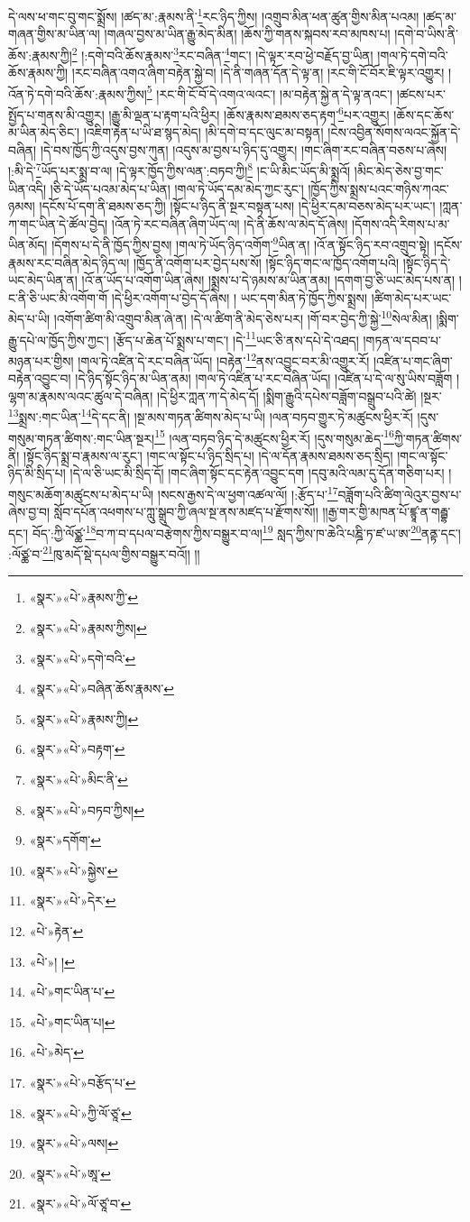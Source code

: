 དེ་ལས་ཕ་གང་བུ་གང་སྨྲོས། །ཚད་མ་:རྣམས་ནི་\footnote{«སྣར་»«པེ་»རྣམས་ཀྱི་}རང་ཉིད་ཀྱིས། །འགྲུབ་མིན་ཕན་ཚུན་གྱིས་མིན་པའམ། །ཚད་མ་གཞན་གྱིས་མ་ཡིན་ལ། །གཞལ་བྱས་མ་ཡིན་རྒྱུ་མེད་མིན། །ཆོས་ཀྱི་གནས་སྐབས་རབ་མཁས་པ། །དགེ་བ་ཡིས་ནི་ཆོས་:རྣམས་ཀྱི།\footnote{«སྣར་»«པེ་»རྣམས་ཀྱིས།} །:དགེ་བའི་ཆོས་རྣམས་\footnote{«སྣར་»«པེ་»དགེ་བའི་}རང་བཞིན་\footnote{«སྣར་»«པེ་»བཞིན་ཆོས་རྣམས་}གང་། །དེ་ལྟར་རབ་ཕྱེ་བརྗོད་བྱ་ཡིན། །གལ་ཏེ་དགེ་བའི་ཆོས་རྣམས་ཀྱི། །རང་བཞིན་འགའ་ཞིག་བརྟེན་སྐྱེ་བ། །དེ་ནི་གཞན་དོན་དེ་ལྟ་ན། །རང་གི་ངོ་བོར་ཇི་ལྟར་འགྱུར། །འོན་ཏེ་དགེ་བའི་ཆོས་:རྣམས་ཀྱིས།\footnote{«སྣར་»«པེ་»རྣམས་ཀྱི།} །རང་གི་ངོ་བོ་དེ་འགའ་ལའང་། །མ་བརྟེན་སྐྱེ་ན་དེ་ལྟ་ནའང་། །ཚངས་པར་སྤྱོད་པ་གནས་མི་འགྱུར། །རྒྱུ་མི་ལྡན་པ་རྟག་པའི་ཕྱིར། །ཆོས་རྣམས་ཐམས་ཅད་རྟག་\footnote{«སྣར་»«པེ་»བརྟག་}པར་འགྱུར། །ཆོས་དང་ཆོས་མ་ཡིན་མེད་ཅིང་། །འཇིག་རྟེན་པ་ཡི་ཐ་སྙད་མེད། །མི་དགེ་བ་དང་ལུང་མ་བསྟན། །ངེས་འབྱིན་སོགས་ལའང་སྐྱོན་དེ་བཞིན། །དེ་བས་ཁྱོད་ཀྱི་འདུས་བྱས་ཀུན། །འདུས་མ་བྱས་པ་ཉིད་དུ་འགྱུར། །གང་ཞིག་རང་བཞིན་བཅས་པ་ཞེས། །:མི་དེ་\footnote{«སྣར་»«པེ་»མིང་ནི་}ཡོད་པར་སྨྲ་བ་ལ། །དེ་ལྟར་ཁྱོད་ཀྱིས་ལན་:བཏབ་ཀྱི།\footnote{«སྣར་»«པེ་»བཏབ་ཀྱིས།} །ང་ཡི་མིང་ཡོད་མི་སྨྲའོ། །མིང་མེད་ཅེས་བྱ་གང་ཡིན་འདི། །ཅི་དེ་ཡོད་པའམ་མེད་པ་ཡིན། །གལ་ཏེ་ཡོད་དམ་མེད་ཀྱང་རུང་། །ཁྱོད་ཀྱིས་སྨྲས་པའང་གཉིས་ཀའང་ཉམས། །དངོས་པོ་དག་ནི་ཐམས་ཅད་ཀྱི། །སྟོང་པ་ཉིད་ནི་སྔར་བསྟན་པས། །དེ་ཕྱིར་དམ་བཅས་མེད་པར་ཡང་། །ཀླན་ཀ་གང་ཡིན་དེ་ཚོལ་བྱེད། །འོན་ཏེ་རང་བཞིན་ཞིག་ཡོད་ལ། །དེ་ནི་ཆོས་ལ་མེད་དོ་ཞེས། །དོགས་འདི་རིགས་པ་མ་ཡིན་མོད། །དོགས་པ་དེ་ནི་ཁྱོད་ཀྱིས་བྱས། །གལ་ཏེ་ཡོད་ཉིད་འགོག་\footnote{«སྣར་»དགོག་}ཡིན་ན། །འོ་ན་སྟོང་ཉིད་རབ་འགྲུབ་སྟེ། །དངོས་རྣམས་རང་བཞིན་མེད་ཉིད་ལ། །ཁྱོད་ནི་འགོག་པར་བྱེད་པས་སོ། །སྟོང་ཉིད་གང་ལ་ཁྱོད་འགོག་པའི། །སྟོང་ཉིད་དེ་ཡང་མེད་ཡིན་ན། །འོ་ན་ཡོད་པ་འགོག་ཡིན་ཞེས། །སྨྲས་པ་དེ་ཉམས་མ་ཡིན་ནམ། །དགག་བྱ་ཅི་ཡང་མེད་པས་ན། །ང་ནི་ཅི་ཡང་མི་འགོག་གོ །དེ་ཕྱིར་འགོག་པ་བྱེད་དོ་ཞེས། །
ཡང་དག་མིན་ཏེ་ཁྱོད་ཀྱིས་སྨྲས། །ཚིག་མེད་པར་ཡང་མེད་པ་ཡི། །འགོག་ཚིག་མི་འགྲུབ་མིན་ཞེ་ན། །དེ་ལ་ཚིག་ནི་མེད་ཅེས་པར། །གོ་བར་བྱེད་ཀྱི་སྐྱེ་\footnote{«སྣར་»«པེ་»སྐྱེས་}སེལ་མིན། །སྨིག་རྒྱུ་དཔེ་ལ་ཁྱོད་ཀྱིས་ཀྱང་། །རྩོད་པ་ཆེན་པོ་སྨྲས་པ་གང་། །དེ་\footnote{«སྣར་»«པེ་»དེར་}ཡང་ཅི་ནས་དཔེ་དེ་འཐད། །གཏན་ལ་དབབ་པ་མཉན་པར་གྱིས། །གལ་ཏེ་འཛིན་དེ་རང་བཞིན་ཡོད། །བརྟེན་\footnote{«པེ་»རྟེན་}ནས་འབྱུང་བར་མི་འགྱུར་རོ། །འཛིན་པ་གང་ཞིག་བརྟེན་འབྱུང་བ། །དེ་ཉིད་སྟོང་ཉིད་མ་ཡིན་ནམ། །གལ་ཏེ་འཛིན་པ་རང་བཞིན་ཡོད། །འཛིན་པ་དེ་ལ་སུ་ཡིས་བཟློག །ལྷག་མ་རྣམས་ལའང་ཚུལ་དེ་བཞིན། །དེ་ཕྱིར་ཀླན་ཀ་དེ་མེད་དོ། །སྨིག་རྒྱུའི་དཔེས་བཟློག་བསྒྲུབ་པའི་ཚེ། །སྔར་\footnote{«པེ་»། །}སྨྲས་:གང་ཡིན་\footnote{«པེ་»གང་ཡིན་པ་}དེ་དང་ནི། །སྔ་མས་གཏན་ཚིགས་མེད་པ་ཡི། །ལན་བཏབ་གྱུར་ཏེ་མཚུངས་ཕྱིར་རོ། །དུས་གསུམ་གཏན་ཚིགས་:གང་ཡིན་སྔར།\footnote{«པེ་»གང་ཡིན་པ།} །ལན་བཏབ་ཉིད་དེ་མཚུངས་ཕྱིར་རོ། །དུས་གསུམ་ཆེད་\footnote{«པེ་»མེད་}ཀྱི་གཏན་ཚིགས་ནི། །སྟོང་ཉིད་སྨྲ་བ་རྣམས་ལ་རུང་། །གང་ལ་སྟོང་པ་ཉིད་སྲིད་པ། །དེ་ལ་དོན་རྣམས་ཐམས་ཅད་སྲིད། །གང་ལ་སྟོང་ཉིད་མི་སྲིད་པ། །དེ་ལ་ཅི་ཡང་མི་སྲིད་དོ། །གང་ཞིག་སྟོང་དང་རྟེན་འབྱུང་དག །དབུ་མའི་ལམ་དུ་དོན་གཅིག་པར། །གསུང་མཆོག་མཚུངས་པ་མེད་པ་ཡི། །སངས་རྒྱས་དེ་ལ་ཕྱག་འཚལ་ལོ། །:རྩོད་པ་\footnote{«སྣར་»«པེ་»བརྩོད་པ་}བཟློག་པའི་ཚིག་ལེའུར་བྱས་པ་ཞེས་བྱ་བ། སློབ་དཔོན་འཕགས་པ་ཀླུ་སྒྲུབ་ཀྱི་ཞལ་སྔ་ནས་མཛད་པ་རྫོགས་སོ།། །།རྒྱ་གར་གྱི་མཁན་པོ་ཛྙཱ་ན་གརྦྷ་དང་། བོད་:ཀྱི་ལོཙྪ་\footnote{«སྣར་»«པེ་»ཀྱི་ལོ་ཙཱ་}བ་ཀ་བ་དཔལ་བརྩེགས་ཀྱིས་བསྒྱུར་བ་ལ།\footnote{«སྣར་»«པེ་»ལས།} སླད་ཀྱིས་ཁ་ཆེའི་པཎྜི་ཏ་ཛ་ཡ་ཨ་\footnote{«སྣར་»«པེ་»ཨཱ་}ནནྟ་དང་། :ལོཙྪ་བ་\footnote{«སྣར་»«པེ་»ལོ་ཙཱ་བ་}ཁུ་མདོ་སྡེ་དཔལ་གྱིས་བསྒྱུར་བའོ།། །།